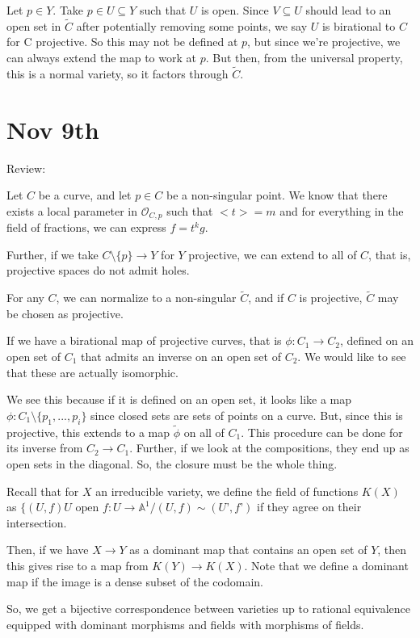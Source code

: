 \documentclass[10pt]{article}
\begin{document}
Let $p \in Y$. Take $p \in U \subseteq Y$ such that $U$ is open. Since $V \subseteq U$ should lead to an open set in $\tilde{C}$ after potentially removing some points, we say $U$ is birational to $C$ for C projective. So this may not be defined at $p$, but since we’re projective, we can always extend the map to work at $p$. But then, from the universal property, this is a normal variety, so it factors through $\tilde{C}$. 

\section{Nov 9th}

Review:

Let $C$ be a curve, and let $p \in C$ be a non-singular point. We know that there exists a local parameter in $\mathcal{O}_{C,p}$ such that $<t> = m$ and for everything in the field of fractions, we can express $f = t^k g$. 

Further, if we take $C \setminus \{ p \} \to Y$ for $Y$ projective, we can extend to all of $C$, that is, projective spaces do not admit holes.

For any $C$, we can normalize to a non-singular $\tilde{C}$, and if $C$ is projective, $\tilde{C}$ may be chosen as projective.

If we have a birational map of projective curves, that is $\phi: C_1 \to C_2$, defined on an open set of $C_1$  that admits an inverse on an open set of $C_2$. We would like to see that these are actually isomorphic.

We see this because if it is defined on an open set, it looks like a map $\phi: C_1 \setminus \{ p_1,...,p_i \}$ since closed sets are sets of points on a curve. But, since this is projective, this extends to a map $\tilde{\phi}$ on all of $C_1$. This procedure can be done for its inverse from $C_2 \to C_1$.  Further, if we look at the compositions, they end up as open sets in the diagonal. So, the closure must be the whole thing.

Recall that for $X$ an irreducible variety, we define the field of functions $K(X)$ as $\{ (U,f) U \text{ open } f: U \to \mathbb{A}^1 / (U,f)\sim (U’, f’)$ if they agree on their intersection.

Then, if we have $X \to Y$ as a dominant map that contains an open set of $Y$, then this gives rise to a map from $K(Y) \to K(X)$. Note that we define a dominant map if the image is a dense subset of the codomain. 

So, we get a bijective correspondence between varieties up to rational equivalence equipped with dominant morphisms and fields with morphisms of fields.
\end{document}
